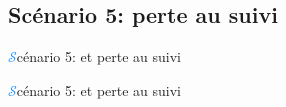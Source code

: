 \subsection{Scénario 5: perte au suivi}
\begin{frame}{{\huge\textcolor{dodgerblue}{$\mathcal{S}$}}cénario 5:  et perte au suivi}
\begin{center}
\end{center}
\end{frame}
\begin{frame}{{\huge\textcolor{dodgerblue}{$\mathcal{S}$}}cénario 5:  et perte au suivi}
\begin{center}
\end{center}
\end{frame}

